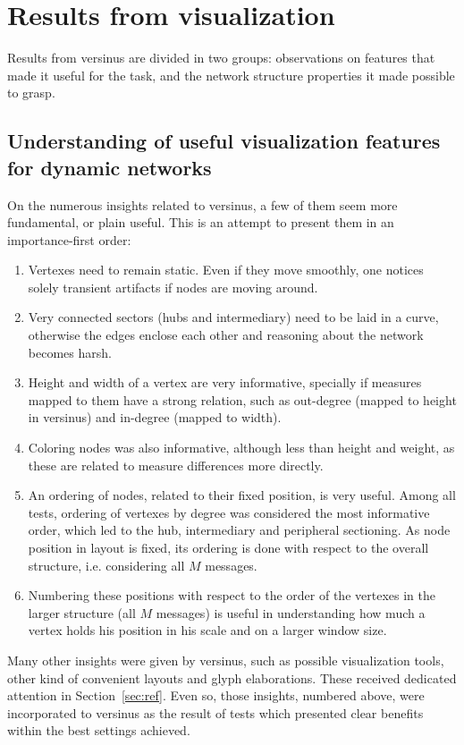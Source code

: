 \section{Results from visualization}
Results from versinus are divided in two groups:
observations on features that made it useful for the task,
and the network structure properties it made possible to grasp.

\subsection{Understanding of useful visualization features for dynamic networks}

On the numerous insights related to versinus, a few of them seem more fundamental, or plain useful. This is an attempt to present them in an importance-first order:
\begin{enumerate}
		    \item Vertexes need to remain static. Even if they move smoothly, one notices solely transient artifacts if nodes are moving around.
			        \item Very connected sectors (hubs and intermediary) need to be laid in a curve, otherwise the edges enclose each other and reasoning about the network becomes harsh.
					    \item Height and width of a vertex are very informative, specially if measures mapped to them have a strong relation, such as out-degree (mapped to height in versinus) and in-degree (mapped to width).
						        \item Coloring nodes was also informative, although less than height and weight, as these are related to measure differences more directly.
								    \item An ordering of nodes, related to their fixed position, is very useful. Among all tests, ordering of vertexes by degree was considered the most informative order, which led to the hub, intermediary and peripheral sectioning. As node position in layout is fixed, its ordering is done with respect to the overall structure, i.e. considering all $M$ messages.
									        \item  Numbering these positions with respect to the order of the vertexes in the larger structure (all $M$ messages) is useful in understanding how much a vertex holds his position in his scale and on a larger window size.
\end{enumerate}

Many other insights were given by versinus, such as possible visualization tools, other kind of convenient layouts and glyph elaborations. These received dedicated attention in Section~\ref{sec:ref}.
Even so, those insights, numbered above, were incorporated to versinus as the result of tests which presented clear benefits within the best settings achieved.

